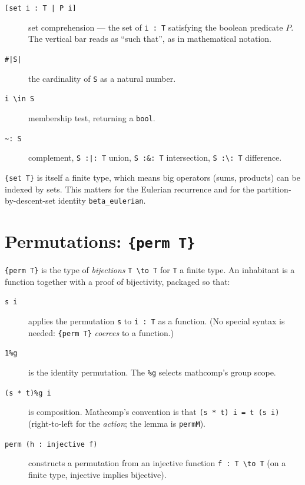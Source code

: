 \begin{description}
  \item[\texttt{[set i : T\ |\ P i]}] set comprehension --- the set
    of \texttt{i : T} satisfying the boolean predicate $P$. The
    vertical bar reads as ``such that'', as in mathematical notation.
  \item[\texttt{\#|S|}] the cardinality of \texttt{S} as a natural
    number.
  \item[\texttt{i \textbackslash in S}] membership test, returning
    a \texttt{bool}.
  \item[\texttt{\textasciitilde:\,S}] complement, \texttt{S\,:|:\,T}
    union, \texttt{S\,:\&:\,T} intersection, \texttt{S\,:\textbackslash:\,T}
    difference.
\end{description}

\noindent \texttt{\{set T\}} is itself a finite type, which means
big operators (sums, products) can be indexed by sets. This matters
for the Eulerian recurrence and for the partition-by-descent-set
identity \texttt{beta\_eulerian}.

\section{Permutations: \texttt{\{perm T\}}}

\texttt{\{perm T\}} is the type of \emph{bijections} \texttt{T \textbackslash to T}
for \texttt{T} a finite type. An inhabitant is a function
together with a proof of bijectivity, packaged so that:

\begin{description}
  \item[\texttt{s i}] applies the permutation \texttt{s} to
    \texttt{i : T} as a function. (No special syntax is needed:
    \texttt{\{perm T\}} \emph{coerces} to a function.)
  \item[\texttt{1\%g}] is the identity permutation. The \texttt{\%g}
    selects mathcomp's group scope.
  \item[\texttt{(s * t)\%g i}] is composition. Mathcomp's convention
    is that \texttt{(s * t) i = t (s i)} (right-to-left for the
    \emph{action}; the lemma is \texttt{permM}).
  \item[\texttt{perm (h : injective f)}] constructs a permutation
    from an injective function \texttt{f : T \textbackslash to T} (on a finite
    type, injective implies bijective).
\end{description}

